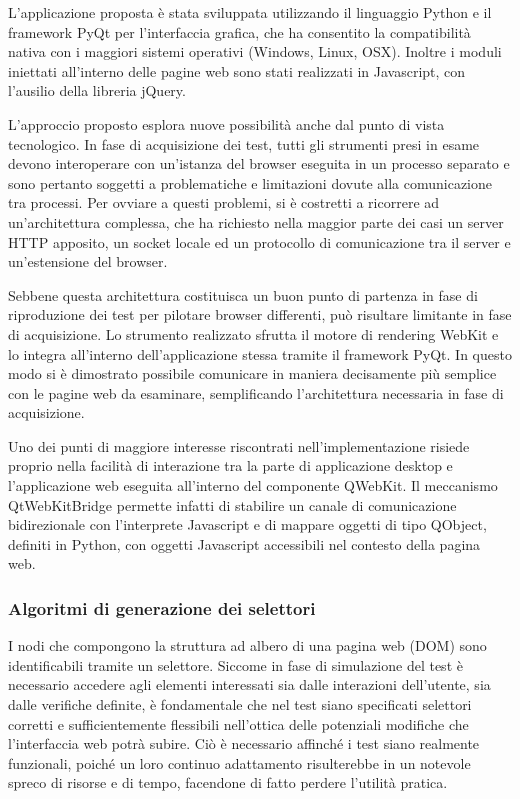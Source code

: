\documentclass[a4paper,12pt]{article}
\begin{document}
L'applicazione proposta è stata sviluppata utilizzando il linguaggio Python e il framework PyQt per l'interfaccia grafica, che ha consentito la compatibilità nativa con i maggiori sistemi operativi (Windows, Linux, OSX). Inoltre i moduli iniettati all'interno delle pagine web sono stati realizzati in Javascript, con l'ausilio della libreria jQuery.

L'approccio proposto esplora nuove possibilità anche dal punto di vista tecnologico. In fase di acquisizione dei test, tutti gli strumenti presi in esame devono interoperare con un'istanza del browser eseguita in un processo separato e sono pertanto soggetti a problematiche e limitazioni dovute alla comunicazione tra processi. Per ovviare a questi problemi, si è costretti a ricorrere ad un'architettura complessa, che ha richiesto nella maggior parte dei casi un server HTTP apposito, un socket locale ed un protocollo di comunicazione tra il server e un'estensione del browser. 

Sebbene questa architettura costituisca un buon punto di partenza in fase di riproduzione dei test per pilotare browser differenti, può risultare limitante in fase di acquisizione. Lo strumento realizzato sfrutta il motore di rendering WebKit e lo integra all'interno dell'applicazione stessa tramite il framework PyQt. In questo modo si è dimostrato possibile comunicare in maniera decisamente più semplice con le pagine web da esaminare, semplificando l'architettura necessaria in fase di acquisizione.

Uno dei punti di maggiore interesse riscontrati nell'implementazione risiede proprio nella facilità di interazione tra la parte di applicazione desktop e l'applicazione web eseguita all'interno del componente QWebKit. Il meccanismo QtWebKitBridge permette infatti di stabilire un canale di comunicazione bidirezionale con l'interprete Javascript e di mappare oggetti di tipo QObject, definiti in Python, con oggetti Javascript accessibili nel contesto della pagina web.

\subsubsection*{Algoritmi di generazione dei selettori}

I nodi che compongono la struttura ad albero di una pagina web (DOM) sono identificabili tramite un selettore. Siccome in fase di simulazione del test è necessario accedere agli elementi interessati sia dalle interazioni dell'utente, sia dalle verifiche definite, è fondamentale che nel test siano specificati selettori corretti e sufficientemente flessibili nell'ottica delle potenziali modifiche che l'interfaccia web potrà subire. Ciò è necessario affinché i test siano realmente funzionali, poiché un loro continuo adattamento risulterebbe in un notevole spreco di risorse e di tempo, facendone di fatto perdere l'utilità pratica.
\end{document}
